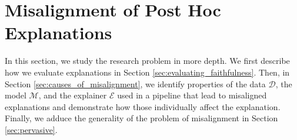 \documentclass[12pt]{article}  %
\newcommand{\mD}{\mathcal{D}}
\newcommand{\mM}{\mathcal{M}}
\newcommand{\mE}{\mathcal{E}}
\begin{document}
     





\section{Misalignment of Post Hoc Explanations}
\label{sec:misalignment}
  In this section, we study the research problem in more depth. We first describe how we evaluate explanations in Section \ref{sec:evaluating_faithfulness}. 
  Then, in Section \ref{sec:causes_of_misalignment}, we identify properties of the data $\mD$, the model $\mM$, and the explainer $\mE$ used in a pipeline that lead to misaligned explanations and demonstrate how those individually affect the explanation. Finally, we adduce the generality of the problem of misalignment in Section \ref{sec:pervasive}. %
\end{document}
